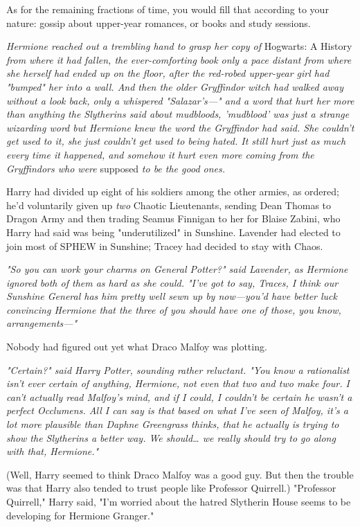 As for the remaining fractions of time, you would fill that according to your 
nature: gossip about upper-year romances, or books and study sessions.

\emph{Hermione reached out a trembling hand to grasp her copy of} Hogwarts: A 
History \emph{from where it had fallen, the ever-comforting book only a pace 
distant from where she herself had ended up on the floor, after the red-robed 
upper-year girl had "bumped" her into a wall. And then the older Gryffindor 
witch had walked away without a look back, only a whispered "Salazar's---" and 
a word that hurt her more than anything the Slytherins said about mudbloods, 
'mudblood' was just a strange wizarding word but Hermione knew the word the 
Gryffindor had said. She couldn't get used to it, she just couldn't get used to 
being hated. It still hurt just as much every time it happened, and somehow it 
hurt even more coming from the Gryffindors who were} supposed \emph{to be the 
good ones.}

Harry had divided up eight of his soldiers among the other armies, as ordered; 
he'd voluntarily given up \emph{two} Chaotic Lieutenants, sending Dean Thomas 
to Dragon Army and then trading Seamus Finnigan to her for Blaise Zabini, who 
Harry had said was being "underutilized" in Sunshine. Lavender had elected to 
join most of SPHEW in Sunshine; Tracey had decided to stay with Chaos.

\emph{"So you can work your charms on General Potter?" said Lavender, as 
Hermione ignored both of them as hard as she could. "I've got to say, Traces, I 
think our Sunshine General has him pretty well sewn up by now---you'd have 
better luck convincing Hermione that the three of you should have one of those, 
you know, arrangements---"}

Nobody had figured out yet what Draco Malfoy was plotting.

\emph{"Certain?" said Harry Potter, sounding rather reluctant. "You know a 
rationalist isn't ever certain of anything, Hermione, not even that two and two 
make four. I can't actually read Malfoy's mind, and if I could, I couldn't be 
certain he wasn't a perfect Occlumens. All I can say is that based on what I've 
seen of Malfoy, it's a lot more plausible than Daphne Greengrass thinks, that 
he actually is trying to show the Slytherins a better way. We should{\ldots} we 
really should try to go along with that, Hermione."}

(Well, Harry seemed to think Draco Malfoy was a good guy. But then the trouble 
was that Harry also tended to trust people like Professor Quirrell.)
\sbreak
"Professor Quirrell," Harry said, "I'm worried about the hatred Slytherin House 
seems to be developing for Hermione Granger."

